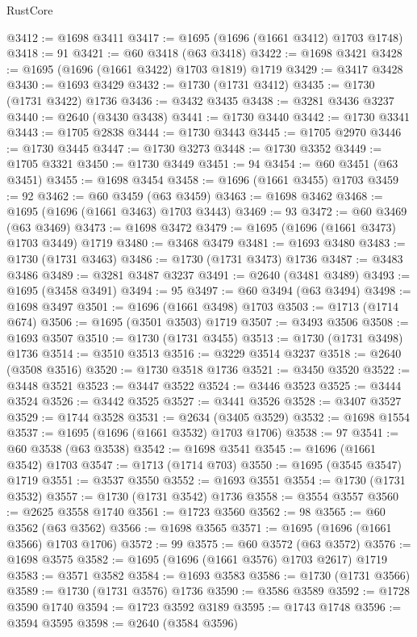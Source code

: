 \begin{lexlean}{RustCore}
\begin{coremodule}
@3412 := @1698 @3411
@3417 := @1695 (@1696 (@1661 @3412) @1703 @1748)
@3418 := 91
@3421 := @60 @3418 (@63 @3418)
@3422 := @1698 @3421
@3428 := @1695 (@1696 (@1661 @3422) @1703 @1819) @1719
@3429 := @3417 @3428
@3430 := @1693 @3429
@3432 := @1730 (@1731 @3412)
@3435 := @1730 (@1731 @3422) @1736
@3436 := @3432 @3435
@3438 := @3281 @3436 @3237
@3440 := @2640 (@3430 @3438)
@3441 := @1730 @3440
@3442 := @1730 @3341
@3443 := @1705 @2838
@3444 := @1730 @3443
@3445 := @1705 @2970
@3446 := @1730 @3445
@3447 := @1730 @3273
@3448 := @1730 @3352
@3449 := @1705 @3321
@3450 := @1730 @3449
@3451 := 94
@3454 := @60 @3451 (@63 @3451)
@3455 := @1698 @3454
@3458 := @1696 (@1661 @3455) @1703
@3459 := 92
@3462 := @60 @3459 (@63 @3459)
@3463 := @1698 @3462
@3468 := @1695 (@1696 (@1661 @3463) @1703 @3443)
@3469 := 93
@3472 := @60 @3469 (@63 @3469)
@3473 := @1698 @3472
@3479 := @1695 (@1696 (@1661 @3473) @1703 @3449) @1719
@3480 := @3468 @3479
@3481 := @1693 @3480
@3483 := @1730 (@1731 @3463)
@3486 := @1730 (@1731 @3473) @1736
@3487 := @3483 @3486
@3489 := @3281 @3487 @3237
@3491 := @2640 (@3481 @3489)
@3493 := @1695 (@3458 @3491)
@3494 := 95
@3497 := @60 @3494 (@63 @3494)
@3498 := @1698 @3497
@3501 := @1696 (@1661 @3498) @1703
@3503 := @1713 (@1714 @674)
@3506 := @1695 (@3501 @3503) @1719
@3507 := @3493 @3506
@3508 := @1693 @3507
@3510 := @1730 (@1731 @3455)
@3513 := @1730 (@1731 @3498) @1736
@3514 := @3510 @3513
@3516 := @3229 @3514 @3237
@3518 := @2640 (@3508 @3516)
@3520 := @1730 @3518 @1736
@3521 := @3450 @3520
@3522 := @3448 @3521
@3523 := @3447 @3522
@3524 := @3446 @3523
@3525 := @3444 @3524
@3526 := @3442 @3525
@3527 := @3441 @3526
@3528 := @3407 @3527
@3529 := @1744 @3528
@3531 := @2634 (@3405 @3529)
@3532 := @1698 @1554
@3537 := @1695 (@1696 (@1661 @3532) @1703 @1706)
@3538 := 97
@3541 := @60 @3538 (@63 @3538)
@3542 := @1698 @3541
@3545 := @1696 (@1661 @3542) @1703
@3547 := @1713 (@1714 @703)
@3550 := @1695 (@3545 @3547) @1719
@3551 := @3537 @3550
@3552 := @1693 @3551
@3554 := @1730 (@1731 @3532)
@3557 := @1730 (@1731 @3542) @1736
@3558 := @3554 @3557
@3560 := @2625 @3558 @1740
@3561 := @1723 @3560
@3562 := 98
@3565 := @60 @3562 (@63 @3562)
@3566 := @1698 @3565
@3571 := @1695 (@1696 (@1661 @3566) @1703 @1706)
@3572 := 99
@3575 := @60 @3572 (@63 @3572)
@3576 := @1698 @3575
@3582 := @1695 (@1696 (@1661 @3576) @1703 @2617) @1719
@3583 := @3571 @3582
@3584 := @1693 @3583
@3586 := @1730 (@1731 @3566)
@3589 := @1730 (@1731 @3576) @1736
@3590 := @3586 @3589
@3592 := @1728 @3590 @1740
@3594 := @1723 @3592 @3189
@3595 := @1743 @1748
@3596 := @3594 @3595
@3598 := @2640 (@3584 @3596)

\end{coremodule}
\end{lexlean}
